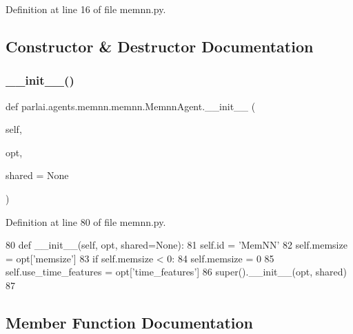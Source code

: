 Definition at line 16 of file memnn.\+py.



\subsection{Constructor \& Destructor Documentation}
\mbox{\label{classparlai_1_1agents_1_1memnn_1_1memnn_1_1MemnnAgent_a256f911504285d19b006def388d0772f}} 
\subsubsection{\texorpdfstring{\+\_\+\+\_\+init\+\_\+\+\_\+()}{\_\_init\_\_()}}
{\footnotesize\ttfamily def parlai.\+agents.\+memnn.\+memnn.\+Memnn\+Agent.\+\_\+\+\_\+init\+\_\+\+\_\+ (\begin{DoxyParamCaption}\item[{}]{self,  }\item[{}]{opt,  }\item[{}]{shared = {\ttfamily None} }\end{DoxyParamCaption})}



Definition at line 80 of file memnn.\+py.


\begin{DoxyCode}
80     \textcolor{keyword}{def }\_\_init\_\_(self, opt, shared=None):
81         self.id = \textcolor{stringliteral}{'MemNN'}
82         self.memsize = opt[\textcolor{stringliteral}{'memsize'}]
83         \textcolor{keywordflow}{if} self.memsize < 0:
84             self.memsize = 0
85         self.use\_time\_features = opt[\textcolor{stringliteral}{'time\_features'}]
86         super().\_\_init\_\_(opt, shared)
87 
\end{DoxyCode}


\subsection{Member Function Documentation}
\mbox{\label{classparlai_1_1agents_1_1memnn_1_1memnn_1_1MemnnAgent_a25443d48c341d3f88a648c8273dfbf66}} 
